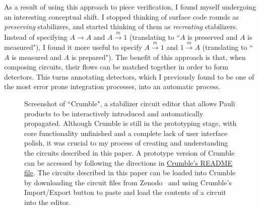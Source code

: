 \documentclass[onecolumn,unpublished,a4paper]{quantumarticle}
\theoremstyle{definition}
\theoremstyle{definition}
\theoremstyle{definition}
\begin{document}
As a result of using this approach to piece verification, I found myself undergoing an interesting conceptual shift.
I stopped thinking of surface code rounds as \emph{preserving} stabilizers, and started thinking of them as \emph{recreating} stabilizers.
Instead of specifying $A \rightarrow A$ and $A \xrightarrow{m} 1$ (translating to ``$A$ is preserved and $A$ is measured"), I found it more useful to specify $A \xrightarrow{m} 1$ and $1 \xrightarrow{m} A$ (translating to ``$A$ is measured and $A$ is prepared").
The benefit of this approach is that, when composing circuits, their flows can be matched together in order to form detectors.
This turns annotating detectors, which I previously found to be one of the most error prone integration processes, into an automatic process.

\begin{figure}[h]
    \centering
    \caption{
        Screenshot of ``Crumble", a stabilizer circuit editor that allows Pauli products to be interactively introduced and automatically propagated.
        Although Crumble is still in the prototyping stage, with core functionality unfinished and a complete lack of user interface polish, it was crucial to my process of creating and understanding the circuits described in this paper.
        A prototype version of Crumble can be accessed by following the directions in \href{https://github.com/quantumlib/Stim/blob/main/glue/crumble/README.md}{Crumble's README file}.
        The circuits described in this paper can be loaded into Crumble by downloading the circuit files from Zenodo~\cite{gidneyybasisdata2022} and using Crumble's Import/Export button to paste and load the contents of a circuit into the editor.
    }
    \label{fig:crumble}
\end{figure}
\end{document}
